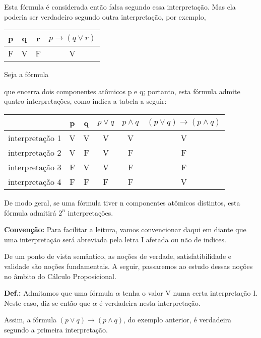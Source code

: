 Esta fórmula é considerada então falsa segundo essa interpretação.
Mas ela poderia ser verdadeiro segundo outra interpretação, por exemplo,

\begin{center}
    \begin{tabular}{c c c c}
        p & q & r & $p \to (q \lor r)$ \\ \hline
        F & V & F & V
    \end{tabular}
\end{center}

\begin{exemplo}
    Seja a fórmula 
\end{exemplo}
\noindent que encerra dois componentes atômicos p e q; portanto, esta fórmula admite quatro interpretações, como indica a tabela a seguir:

\begin{center}
    \begin{tabular}{c | c c c c c}
                        & p & q & $p \lor q$ & $p \land q$ & $(p \lor q) \to (p \land q)$ \\ \hline
        interpretação 1 & V & V & V          & V            & V \\
        interpretação 2 & V & F & V          & F            & F \\
        interpretação 3 & F & V & V          & F            & F \\
        interpretação 4 & F & F & F          & F            & V
    \end{tabular}
\end{center}

De modo geral, se uma fórmula tiver n componentes atômicos distintos, esta fórmula admitirá $2^n$ interpretações.

\bigskip
\noindent
\textbf{Convenção:} Para facilitar a leitura, vamos convencionar daqui em diante que uma interpretação será abreviada pela letra I afetada ou não de indices.

De um ponto de vista semântico, as noções de verdade, satisfatibilidade e validade são noções fundamentais.
A seguir, passaremos ao estudo dessas noções no  âmbito do Cálculo Proposicional.

\bigskip
\noindent
\textbf{Def.:} Admitamos que uma fórmula $\alpha$ tenha o valor V numa certa interpretação I.
Neste caso, diz-se então que $\alpha$ é verdadeira nesta interpretação.

Assim, a fórmula $(p \lor q) \to (p \land q)$, do exemplo anterior, é verdadeira segundo a primeira interpretação.

